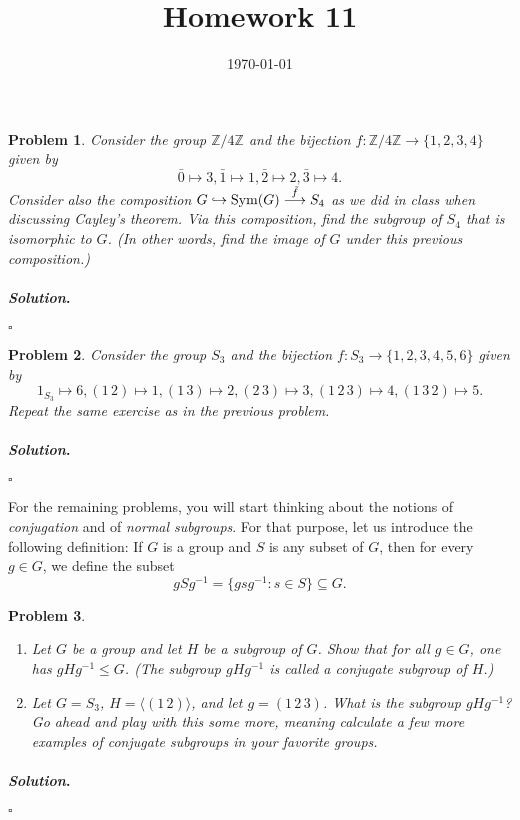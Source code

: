 \documentclass[reqno]{amsart}
\theoremstyle{plain}
\newtheorem{problem}{Problem}
\theoremstyle{definition}
\newenvironment{solution}{\paragraph{\emph{Solution}.}}{\hfill$\square$}
\begin{document}
 

\title[Homework 11]{Homework 11}

\date{\today} 
\maketitle 


\begin{problem}
Consider the group $\mathbb{Z}/4\mathbb{Z}$ and the bijection $f:\mathbb{Z}/4\mathbb{Z} \rightarrow \{1,2,3,4 \}$ given by
$$\bar{0}\mapsto 3, \bar{1} \mapsto 1, \bar{2} \mapsto 2, \bar{3} \mapsto 4. $$
Consider also the composition $G \hookrightarrow {\rm Sym}(G) \stackrel{\tilde{f}}{\longrightarrow} S_{4}$ as we did in class when discussing Cayley's theorem.  Via this composition, find the subgroup of $S_{4}$ that is isomorphic to $G$.  (In other words, find the image of $G$ under this previous composition.)
\end{problem}
\begin{solution}

\end{solution}

\begin{problem}
Consider the group $S_{3}$ and the bijection $f:S_{3} \rightarrow \{1,2,3,4,5,6 \}$ given by
$$1_{S_{3}}\mapsto 6,(1 \, 2) \mapsto 1, (1 \, 3) \mapsto 2, (2 \, 3) \mapsto 3, (1 \, 2 \, 3) \mapsto 4, (1 \, 3 \, 2) \mapsto 5. $$
Repeat the same exercise as in the previous problem.
\end{problem}
\begin{solution}

\end{solution}

For the remaining problems, you will start thinking about the notions of \emph{conjugation} and of \emph{normal subgroups}.  For that purpose, let us introduce the following definition:  If $G$ is a group and $S$ is any subset of $G$, then for every $g \in G$, we define the subset
$$gSg^{-1} = \{gsg^{-1} : s \in S \} \subseteq G.$$



\begin{problem}
\hspace{1cm}
\begin{enumerate}
\item Let $G$ be a group and let $H$ be a subgroup of $G$.  Show that for all $g \in G$, one has $gHg^{-1} \le G$.  (The subgroup $gHg^{-1}$ is called a \emph{conjugate subgroup} of $H$.)
\item Let $G = S_{3}$, $H = \langle (1 \, 2) \rangle$, and let $g = (1 \, 2 \, 3)$.  What is the subgroup $gHg^{-1}$?  Go ahead and play with this some more, meaning calculate a few more examples of conjugate subgroups in your favorite groups.
\end{enumerate}
\end{problem}
\begin{solution}

\end{solution}
\end{document}
